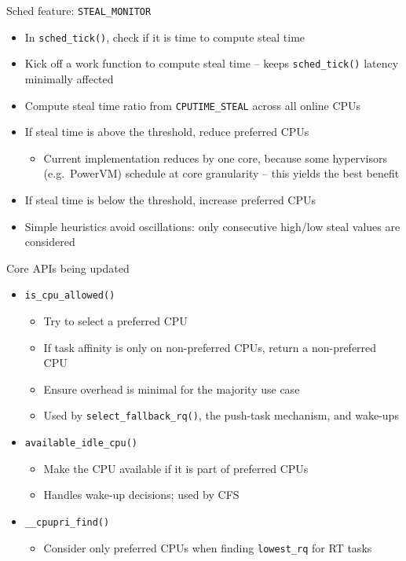 \documentclass[xetex, table, 10pt,%
aspectratio=169%
]{beamer}
\begin{document}
\begin{frame}{Sched feature: \texttt{STEAL\_MONITOR}}
\begin{itemize}
  \item In \texttt{sched\_tick()}, check if it is time to compute steal
    time
  \item Kick off a work function to compute steal time -- keeps
    \texttt{sched\_tick()} latency minimally affected
  \item Compute steal time ratio from \texttt{CPUTIME\_STEAL} across
    all online CPUs
  \item If steal time is above the threshold, reduce preferred CPUs
  \begin{itemize}
    \item Current implementation reduces by one core, because some
      hypervisors (e.g.\ PowerVM) schedule at core granularity --
      this yields the best benefit
  \end{itemize}
  \item If steal time is below the threshold, increase preferred
    CPUs
  \item Simple heuristics avoid oscillations: only consecutive
    high/low steal values are considered
\end{itemize}
\end{frame}

\begin{frame}{Core APIs being updated}
\begin{itemize}
  \item \texttt{is\_cpu\_allowed()}
  \begin{itemize}
    \item Try to select a preferred CPU
    \item If task affinity is only on non-preferred CPUs, return a
      non-preferred CPU
    \item Ensure overhead is minimal for the majority use case
    \item Used by \texttt{select\_fallback\_rq()}, the push-task
      mechanism, and wake-ups
  \end{itemize}
  \item \texttt{available\_idle\_cpu()}
  \begin{itemize}
    \item Make the CPU available if it is part of preferred CPUs
    \item Handles wake-up decisions; used by CFS
  \end{itemize}
  \item \texttt{\_\_cpupri\_find()}
  \begin{itemize}
    \item Consider only preferred CPUs when finding
      \texttt{lowest\_rq} for RT tasks
  \end{itemize}
\end{itemize}
\end{frame}
\end{document}
